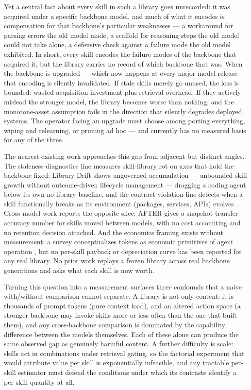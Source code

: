 \documentclass[11pt]{article}
\begin{document}
Yet a central fact about every skill in such a library goes unrecorded: it was acquired under a specific backbone model, and much of what it encodes is compensation for that backbone's particular weaknesses --- a workaround for parsing errors the old model made, a scaffold for reasoning steps the old model could not take alone, a defensive check against a failure mode the old model exhibited. In short, every skill encodes the failure modes of the backbone that acquired it, but the library carries no record of which backbone that was. When the backbone is upgraded --- which now happens at every major model release --- that encoding is silently invalidated. If stale skills merely go unused, the loss is bounded: wasted acquisition investment plus retrieval overhead. If they actively mislead the stronger model, the library becomes worse than nothing, and the monotone-asset assumption fails in the direction that silently degrades deployed systems. The operator facing an upgrade must choose among porting everything, wiping and relearning, or pruning ad hoc --- and currently has no measured basis for any of the three.

The nearest existing work approaches this gap from adjacent but distinct angles. The staleness-diagnostics line measures skill-library rot on axes that hold the backbone fixed: Library Drift \citep{LibraryDrift2026} shows ungoverned accumulation --- unbounded skill growth without outcome-driven lifecycle management --- dragging a coding agent below its own no-library baseline, and the contract-violation line detects when a skill functionally breaks as its environment (packages, services, APIs) evolves \citep{SkillGuard2026}. Cross-model work reports the opposite slice: AFTER \citep{AFTER2026} gives a snapshot transfer-accuracy number for skills moved between models, with no cost accounting and no retention decision attached. And the economics framing exists without measurement: a survey conceptualizes tokens as economic primitives of agent operation \citep{TokenEconomics2026}, but no per-skill payback or depreciation curve has been reported for any real library. No prior work replays a frozen library across real backbone generations and asks what each skill is now worth.

Turning this question into a measurement surfaces three confounds that a naive with/without comparison cannot separate. A library is not only content: it is thousands of prompt tokens (pure context load), and an altered action space (a stronger backbone may invoke skills more or less often than the one that built them), and any cross-backbone comparison is dominated by the capability difference between the models themselves. Each of these alone can produce the same observed gap as genuinely harmful content. A further difficulty is scale: skills act in combinations under retrieval gating, so the factorial experiment that would attribute value per skill is exponentially infeasible, and any tractable per-skill estimator must defend the conditions under which its contrasts identify a per-skill quantity at all.
\end{document}
